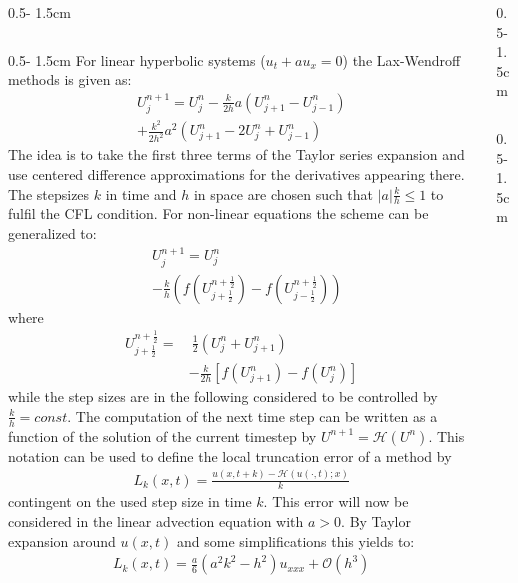 \documentclass{uibposter}
\begin{document}
\begin{frame}[fragile]
\begin{columns}
\begin{column}{0.5\textwidth - 1.5cm}
\begin{column}{0.5\textwidth - 1.5cm}
For linear hyperbolic systems ($u_t + au_x = 0$) the Lax-Wendroff methods is given as:
\begin{align*}
U_j^{n+1} = U_j^n - \frac{k}{2h}a(U_{j+1}^n  - U_{j-1}^n)\\
+ \frac{k^2}{2h^2}a^2(U_{j+1}^n - 2U_j^n + U_{j-1}^n)
\end{align*}
The idea is to take the first three terms of the Taylor series expansion and use centered difference approximations for the derivatives appearing there. The stepsizes $k$ in time and $h$ in space are chosen such that $|a|\frac{k}{h} \leq 1$ to fulfil the CFL condition.
For non-linear equations the scheme can be generalized to:
\begin{align*}
&U_j^{n+1} = U_j^n\\
&- \frac{k}{h}\left(f\left(U_{j+\frac{1}{2}}^{n+\frac{1}{2}}\right) - f\left(U_{j-\frac{1}{2}}^{n+\frac{1}{2}}\right)\right)
\end{align*}
where  
\begin{align*}
U_{j+\frac{1}{2}}^{n+\frac{1}{2}} =&~ \frac{1}{2} (U_j^n + U_{j+1}^n)\\
&- \frac{k}{2h}[f(U_{j+1}^n) - f(U_j^n)]
\end{align*}
while the step sizes are in the following considered to be controlled by $\frac{k}{h} = const$. The computation of the next time step can be written as a function of the solution of the current timestep by $U^{n+1} = \mathcal{H}(U^n)$. This notation can be used to define the local truncation error of a method by
\begin{align*}
L_k(x, t) = \frac{u(x, t+k) - \mathcal{H}(u(\cdot, t); x)}{k}
\end{align*}
contingent on the used step size in time $k$. This error will now be considered in the linear advection equation with $a > 0$. By Taylor expansion around $u(x, t)$ and some simplifications this yields to:
\begin{align*}
L_k(x, t) = \frac{a}{6}(a^2 k^2 - h^2)u_{xxx} + \mathcal{O}(h^3)
\end{align*}

    \end{column}
\end{column}
\begin{column}{0.5\textwidth - 1.5cm}
\begin{column}{0.5\textwidth - 1.5cm}
\vspace*{-14.5cm}


\end{column}
\end{column}
\end{columns}
\end{frame}
\end{document}
